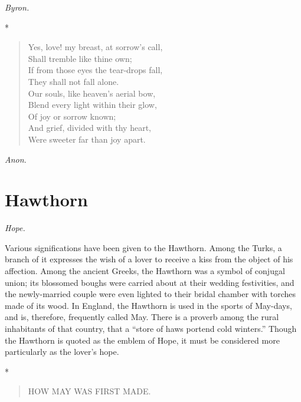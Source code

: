 \documentclass[11pt,twoside]{article}
\newcommand\flower[2]{\section*{#1}\addcontentsline{toc}{section}{#1}%
  \noindent\textit{#2.}\par\medskip}
\newcommand\stars{\begin{center}*\quad*\quad*\end{center}}
\newcommand\by[1]{\par\hfill\textit{#1}\par}
\begin{document}
\by{Byron.}

\stars

\begin{verse}
Yes, love! my breast, at sorrow’s call,\\
\quad Shall tremble like thine own;\\
If from those eyes the tear-drops fall,\\
\quad They shall not fall alone.\\
Our souls, like heaven’s aerial bow,\\
Blend every light within their glow,\\
\quad Of joy or sorrow known;\\
And grief, divided with thy heart,\\
Were sweeter far than joy apart.
\end{verse}

\by{Anon.}

\flower{Hawthorn}{Hope}

Various significations have been given to the Hawthorn. Among the Turks, a branch of it expresses the wish of a lover to receive a kiss from the object of his affection. Among the ancient Greeks, the Hawthorn was a symbol of conjugal union; its blossomed boughs were carried about at their wedding festivities, and the newly-married couple were even lighted to their bridal chamber with torches made of its wood. In England, the Hawthorn is used in the sports of May-days, and is, therefore, frequently called May. There is a proverb among the rural inhabitants of that country, that a “store of haws portend cold winters.” Though the Hawthorn is quoted as the emblem of Hope, it must be considered more particularly as the lover’s hope.

\stars

\begin{verse}
HOW MAY WAS FIRST MADE.
\end{verse}
\end{document}
